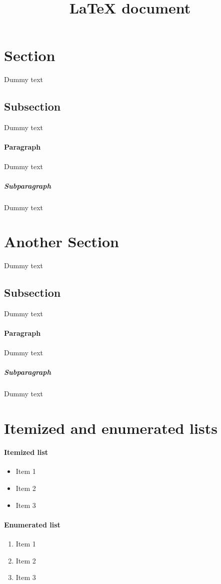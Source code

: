 \documentclass[twoside, titlepage]{article}
\title{LaTeX document}
\begin{document}
\maketitle

\pagestyle{fancy}
\fancyhf{} %
\fancyhf[OHL]{\leftmark} %
\fancyhf[EHR]{\rightmark} %
\fancyhf[FC]{\leftmark} %
\fancyfoot[R]{\thepage} %

\tableofcontents
\newpage

\section{Section}
Dummy text
\subsection{Subsection}
Dummy text
\paragraph{Paragraph}
Dummy text
\subparagraph{Subparagraph}
Dummy text

\section{Another Section}
Dummy text
\subsection{Subsection}
Dummy text
\paragraph{Paragraph}
Dummy text
\subparagraph{Subparagraph}
Dummy text

\section{Itemized and enumerated lists}
\paragraph{Itemized list}
\begin{itemize}
\item Item 1
\item Item 2
\item Item 3
\end{itemize}
\paragraph{Enumerated list}
\begin{enumerate}
\item Item 1
\item Item 2
\item Item 3
\end{enumerate}
\end{document}
